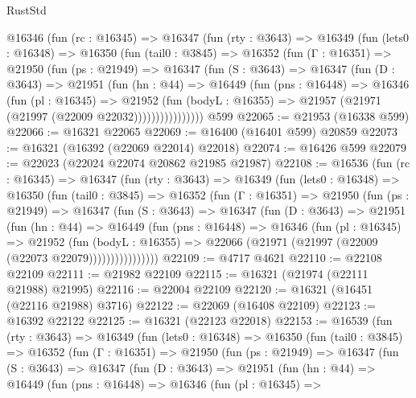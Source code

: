 \begin{lexlean}{RustStd}
\begin{coremodule}
    @16346
      (fun (rc : @16345) =>
      @16347
        (fun (rty : @3643) =>
        @16349
          (fun (lets0 : @16348) =>
          @16350
            (fun (tail0 : @3845) =>
            @16352
              (fun (Γ : @16351) =>
              @21950
                (fun (ps : @21949) =>
                @16347
                  (fun (S : @3643) =>
                  @16347
                    (fun (D : @3643) =>
                    @21951
                      (fun (hn : @44) =>
                      @16449
                        (fun (pns : @16448) =>
                        @16346
                          (fun (pl : @16345) =>
                          @21952
                            (fun (bodyL : @16355) =>
                            @21957 (@21971 (@21997 (@22009 @22032))))))))))))))))
    @599
@22065 := @21953 (@16338 @599)
@22066 := @16321 @22065
@22069 := @16400 (@16401 @599) @20859
@22073 := @16321 (@16392 (@22069 @22014) @22018)
@22074 := @16426 @599
@22079 := @22023 (@22024 @22074 @20862 @21985 @21987)
@22108 := @16536
    (fun (rc : @16345) =>
    @16347
      (fun (rty : @3643) =>
      @16349
        (fun (lets0 : @16348) =>
        @16350
          (fun (tail0 : @3845) =>
          @16352
            (fun (Γ : @16351) =>
            @21950
              (fun (ps : @21949) =>
              @16347
                (fun (S : @3643) =>
                @16347
                  (fun (D : @3643) =>
                  @21951
                    (fun (hn : @44) =>
                    @16449
                      (fun (pns : @16448) =>
                      @16346
                        (fun (pl : @16345) =>
                        @21952
                          (fun (bodyL : @16355) =>
                          @22066 (@21971 (@21997 (@22009 (@22073 @22079))))))))))))))))
@22109 := @4717 @4621
@22110 := @22108 @22109
@22111 := @21982 @22109
@22115 := @16321 (@21974 (@22111 @21988) @21995)
@22116 := @22004 @22109
@22120 := @16321 (@16451 (@22116 @21988) @3716)
@22122 := @22069 (@16408 @22109)
@22123 := @16392 @22122
@22125 := @16321 (@22123 @22018)
@22153 := @16539
    (fun (rty : @3643) =>
    @16349
      (fun (lets0 : @16348) =>
      @16350
        (fun (tail0 : @3845) =>
        @16352
          (fun (Γ : @16351) =>
          @21950
            (fun (ps : @21949) =>
            @16347
              (fun (S : @3643) =>
              @16347
                (fun (D : @3643) =>
                @21951
                  (fun (hn : @44) =>
                  @16449
                    (fun (pns : @16448) =>
                    @16346
                      (fun (pl : @16345) =>

\end{coremodule}
\end{lexlean}
